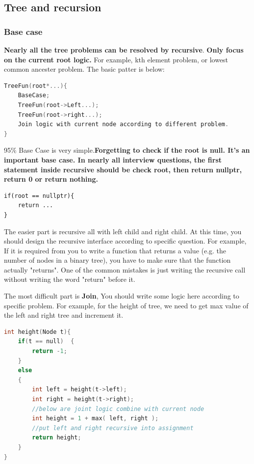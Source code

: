 \documentclass[a4paper,11pt,twoside]{book}
\begin{document}
\subsection{Tree and recursion} 
\subsubsection{Base case}

	\par \textbf{Nearly all the tree problems can be resolved by recursive}. \textbf{Only focus on the current root logic.} For example, kth element problem, or lowest common ancester problem. The basic patter is below: 
	
\begin{lstlisting}[frame=single, language=c++]
TreeFun(root*...){
	BaseCase;
	TreeFun(root->Left...);
	TreeFun(root->right...);
	Join logic with current node according to different problem.
}	
\end{lstlisting}

	\par 95\% Base Case is very simple.\textbf{Forgetting to check if the root is null. It's an important base case. In nearly all interview questions, the first statement inside recursive should be check root, then return nullptr, return 0 or return nothing.}


\begin{lstlisting}
if(root == nullptr){
	return ...
}	
\end{lstlisting}	

	\par The easier part is recursive all with left child and right child. At this time, you should design the recursive interface according to specific question. For example, If it is required from you to write a function that returns a value (e.g. the number of nodes in a binary tree), you have to make sure that the function actually "returns". One of the common mistakes is just writing the recursive call without writing the word "return" before it.

	\par The most difficult part is \textbf{Join}, You should write some logic here according to specific problem. For example, for the height of tree, we need to get max value of the left and right tree and increment it. 
\begin{lstlisting}[frame=single, language=c++]
int height(Node t){
	if(t == null)  {  
		return -1;   
	}
	else
	{
		int left = height(t->left);
		int right = height(t->right);
		//below are joint logic combine with current node
		int height = 1 + max( left, right );
		//put left and right recursive into assignment
		return height;
	}
}			
\end{lstlisting}		
\end{document}
